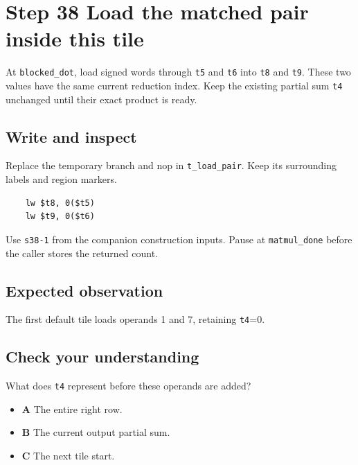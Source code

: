 \section{Step 38 Load the matched pair inside this tile}\label{matmul-s38}

At \texttt{blocked\_dot}, load signed words through \texttt{t5} and \texttt{t6} into \texttt{t8} and \texttt{t9}. These two values have the same current reduction index. Keep the existing partial sum \texttt{t4} unchanged until their exact product is ready.

\subsection{Write and inspect}
Replace the temporary branch and nop in \texttt{t\_load\_pair}. Keep its surrounding labels and region markers.

\begin{verbatim}
    lw $t8, 0($t5)
    lw $t9, 0($t6)
\end{verbatim}
Use \texttt{s38-1} from the companion construction inputs. Pause at \texttt{matmul\_done} before the caller stores the returned count.

\subsection{Expected observation}
The first default tile loads operands 1 and 7, retaining \texttt{t4}=0.

\subsection{Check your understanding}
What does \texttt{t4} represent before these operands are added?

\begin{itemize}
  \item \textbf{A} The entire right row.
  \item \textbf{B} The current output partial sum.
  \item \textbf{C} The next tile start.
\end{itemize}
